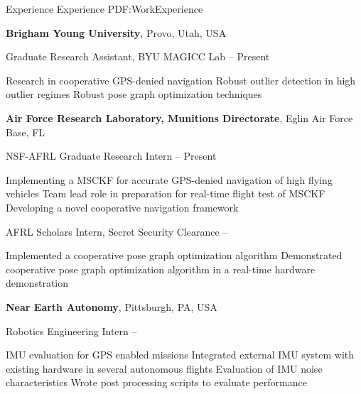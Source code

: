 \documentclass[letterpaper,MMMyyyy,nonstopmode]{simpleresumecv}
\begin{document}
\begin{Body}


\Section
{Experience}
{Experience}
{PDF:WorkExperience}

\Entry
\textbf{Brigham Young University},
Provo, Utah, USA

\Gap
\BulletItem
Graduate Research Assistant, BYU MAGICC Lab
\hfill 
{}--
Present
\begin{Detail}
\SubBulletItem
Research in cooperative GPS-denied navigation
\SubBulletItem
Robust outlier detection in high outlier regimes
\SubBulletItem 
Robust pose graph optimization techniques
\end{Detail}

\Entry
\textbf{Air Force Research Laboratory, Munitions Directorate},
Eglin Air Force Base, FL

\Gap 
\BulletItem 
NSF-AFRL Graduate Research Intern
\hfill 
{} --
Present
\begin{Detail}
\SubBulletItem
Implementing a MSCKF for accurate GPS-denied navigation of high flying vehicles
\SubBulletItem 
Team lead role in preparation for real-time flight test of MSCKF
\SubBulletItem
Developing a novel cooperative navigation framework
\end{Detail}

\Gap
\BulletItem
AFRL Scholars Intern, Secret Security Clearance
\hfill 
{}--
\begin{Detail}
\SubBulletItem
Implemented a cooperative pose graph optimization algorithm 
\SubBulletItem
Demonstrated cooperative pose graph optimization algorithm in a real-time hardware demonstration
\end{Detail}


\Gap
\Entry
\textbf{Near Earth Autonomy},
Pittsburgh, PA, USA

\Gap
\BulletItem
Robotics Engineering Intern
\hfill
{} --
\begin{Detail}
\SubBulletItem
IMU evaluation for GPS enabled missions
\SubBulletItem
Integrated external IMU system with existing hardware in several autonomous flights
\SubBulletItem
Evaluation of IMU noise characteristics
\SubBulletItem
Wrote post processing scripts to evaluate performance
\end{Detail}



\end{Body}
\end{document}
